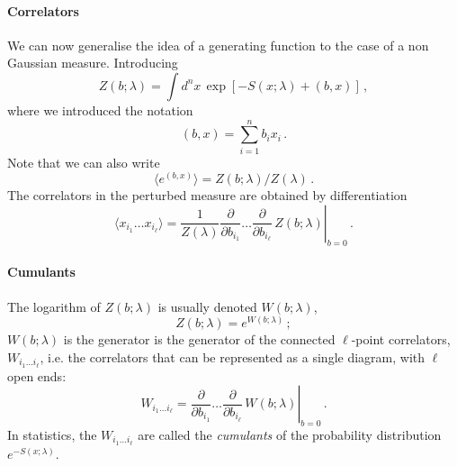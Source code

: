 \paragraph{Correlators}

We can now generalise the idea of a generating function to the case of
a non Gaussian measure. Introducing
\begin{equation}
  \label{eq:GenFunctPert}
  Z(b;\lambda) = \int d^nx\, \exp\left[
    -S(x;\lambda) + (b,x)
    \right]\, ,
\end{equation}
where we introduced the notation
\begin{equation}
  \label{eq:ScalProd}
  (b,x) = \sum_{i=1}^n b_i x_i\, .
\end{equation}
Note that we can also write
\begin{equation}
  \label{eq:GenFunctPertTwo}
  \langle e^{(b,x)} \rangle = Z(b;\lambda)/Z(\lambda)\, .
\end{equation}
The correlators in the perturbed measure are obtained by
differentiation
\begin{equation}
  \label{eq:CorrGenPert}
  \langle x_{i_1} \ldots x_{i_\ell}\rangle = \frac{1}{Z(\lambda)} \left.
  \frac{\partial}{\partial b_{i_1}} \ldots \frac{\partial}{\partial b_{i_\ell}}\,
  Z(b;\lambda)
\right|_{b=0} \, .
\end{equation}

\paragraph{Cumulants}

The logarithm of $Z(b;\lambda)$ is usually denoted $W(b;\lambda)$, 
\begin{equation}
  \label{eq:WGenDef}
  Z(b;\lambda) = e^{W(b;\lambda)}\, ;
\end{equation}
$W(b;\lambda)$ is the generator is the generator of the connected
$\ell$-point correlators, $W_{i_1 \ldots i_\ell}$, i.e. the correlators that can be represented as a single
diagram, with $\ell$ open ends:
\begin{equation}
  \label{eq:DiffWGen}
  W_{i_1 \ldots i_\ell} = \left.
  \frac{\partial}{\partial b_{i_1}} \ldots \frac{\partial}{\partial b_{i_\ell}}\,
  W(b;\lambda)
\right|_{b=0} \, .
\end{equation}
In statistics, the $W_{i_1 \ldots i_\ell}$ are called the {\em
  cumulants} of the probability distribution $e^{-S(x;\lambda)}$.



